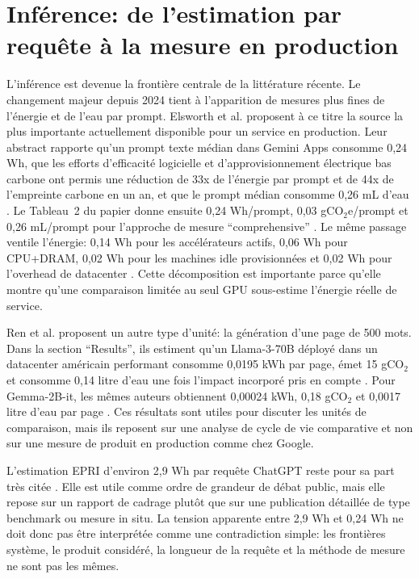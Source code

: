 \documentclass[11pt,a4paper]{article}
\begin{document}
\section{Inférence: de l'estimation par requête à la mesure en production}
L'inférence est devenue la frontière centrale de la littérature récente. Le changement majeur depuis 2024 tient à l'apparition de mesures plus fines de l'énergie et de l'eau par prompt. Elsworth et al. proposent à ce titre la source la plus importante actuellement disponible pour un service en production. Leur abstract rapporte qu'un prompt texte médian dans Gemini Apps consomme 0,24 Wh, que les efforts d'efficacité logicielle et d'approvisionnement électrique bas carbone ont permis une réduction de 33x de l'énergie par prompt et de 44x de l'empreinte carbone en un an, et que le prompt médian consomme 0,26 mL d'eau \cite{elsworth2025}. Le Tableau~2 du papier donne ensuite 0,24 Wh/prompt, 0,03 gCO$_2$e/prompt et 0,26 mL/prompt pour l'approche de mesure ``comprehensive'' \cite{elsworth2025}. Le même passage ventile l'énergie: 0,14 Wh pour les accélérateurs actifs, 0,06 Wh pour CPU+DRAM, 0,02 Wh pour les machines idle provisionnées et 0,02 Wh pour l'overhead de datacenter \cite{elsworth2025}. Cette décomposition est importante parce qu'elle montre qu'une comparaison limitée au seul GPU sous-estime l'énergie réelle de service.

Ren et al. proposent un autre type d'unité: la génération d'une page de 500 mots. Dans la section ``Results'', ils estiment qu'un Llama-3-70B déployé dans un datacenter américain performant consomme 0,0195 kWh par page, émet 15 gCO$_2$ et consomme 0,14 litre d'eau une fois l'impact incorporé pris en compte \cite{ren2024}. Pour Gemma-2B-it, les mêmes auteurs obtiennent 0,00024 kWh, 0,18 gCO$_2$ et 0,0017 litre d'eau par page \cite{ren2024}. Ces résultats sont utiles pour discuter les unités de comparaison, mais ils reposent sur une analyse de cycle de vie comparative et non sur une mesure de produit en production comme chez Google.

L'estimation EPRI d'environ 2,9 Wh par requête ChatGPT reste pour sa part très citée \cite{epri2024}. Elle est utile comme ordre de grandeur de débat public, mais elle repose sur un rapport de cadrage plutôt que sur une publication détaillée de type benchmark ou mesure in situ. La tension apparente entre 2,9 Wh et 0,24 Wh ne doit donc pas être interprétée comme une contradiction simple: les frontières système, le produit considéré, la longueur de la requête et la méthode de mesure ne sont pas les mêmes.
\end{document}

